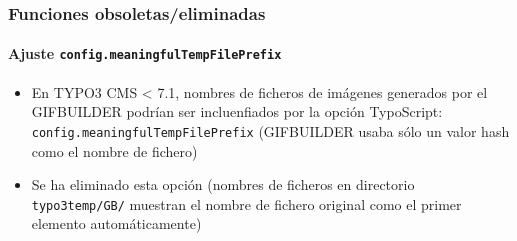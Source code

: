 
\begin{frame}[fragile]
	\frametitle{Funciones obsoletas/eliminadas}
	\framesubtitle{Ajuste \texttt{config.meaningfulTempFilePrefix}}

	\begin{itemize}

		\item En TYPO3 CMS < 7.1, nombres de ficheros de imágenes generados por el GIFBUILDER podrían ser
			incluenfiados por la opción TypoScript:\newline
			\texttt{config.meaningfulTempFilePrefix}\newline
			\small
				(GIFBUILDER usaba sólo un valor hash como el nombre de fichero)
			\normalsize

		\item Se ha eliminado esta opción (nombres de ficheros en directorio \texttt{typo3temp/GB/}
			muestran el nombre de fichero original como el primer elemento automáticamente)

	\end{itemize}

\end{frame}




